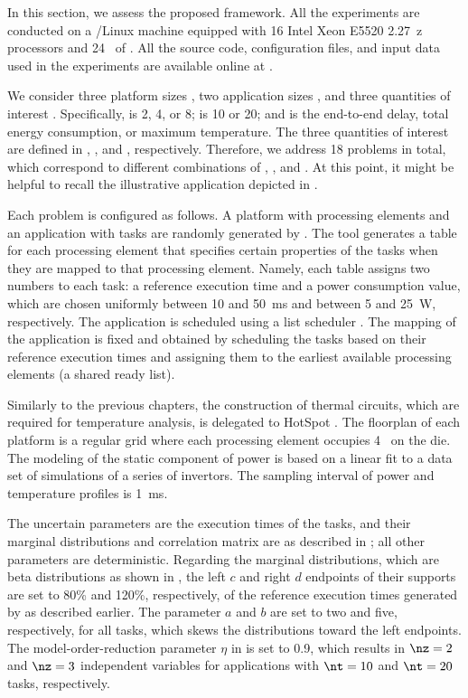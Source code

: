 In this section, we assess the proposed framework. All the experiments are
conducted on a /Linux machine equipped with 16 Intel Xeon E5520
2.27~z processors and 24~ of . All the source code,
configuration files, and input data used in the experiments are available online
at \cite{eslab2017a}.

We consider three platform sizes \np, two application sizes \nt, and three
quantities of interest \g. Specifically, \np is 2, 4, or 8; \nt is 10 or 20; and
\g is the end-to-end delay, total energy consumption, or maximum temperature.
The three quantities of interest are defined in ,
, and , respectively. Therefore, we
address 18 problems in total, which correspond to different combinations of \np,
\nt, and \g. At this point, it might be helpful to recall the illustrative
application depicted in .

Each problem is configured as follows. A platform with \np processing elements
and an application with \nt tasks are randomly generated by 
\cite{dick1998}. The tool generates a table for each processing element that
specifies certain properties of the tasks when they are mapped to that
processing element. Namely, each table assigns two numbers to each task: a
reference execution time and a power consumption value, which are chosen
uniformly between 10 and 50~ms and between 5 and 25~W, respectively. The
application is scheduled using a list scheduler \cite{adam1974}. The mapping of
the application is fixed and obtained by scheduling the tasks based on their
reference execution times and assigning them to the earliest available
processing elements (a shared ready list).

Similarly to the previous chapters, the construction of thermal 
circuits, which are required for temperature analysis, is delegated to HotSpot
\cite{skadron2003}. The floorplan of each platform is a regular grid where each
processing element occupies 4~ on the die. The modeling of the
static component of power is based on a linear fit to a data set of 
simulations of a series of  invertors. The sampling interval \dt of
power and temperature profiles is 1~ms.

The uncertain parameters \vu are the execution times of the tasks, and their
marginal distributions and correlation matrix are as described in
; all other parameters are deterministic.
Regarding the marginal distributions, which are beta distributions as shown in
, the left $c$ and right $d$ endpoints of their supports
are set to 80\% and 120\%, respectively, of the reference execution times
generated by  as described earlier. The parameter $a$ and $b$ are set
to two and five, respectively, for all tasks, which skews the distributions
toward the left endpoints. The model-order-reduction parameter $\eta$ in
 is set to 0.9, which results in $\nz = 2$ and $\nz
= 3$ independent variables for applications with $\nt = 10$ and $\nt = 20$
tasks, respectively.

